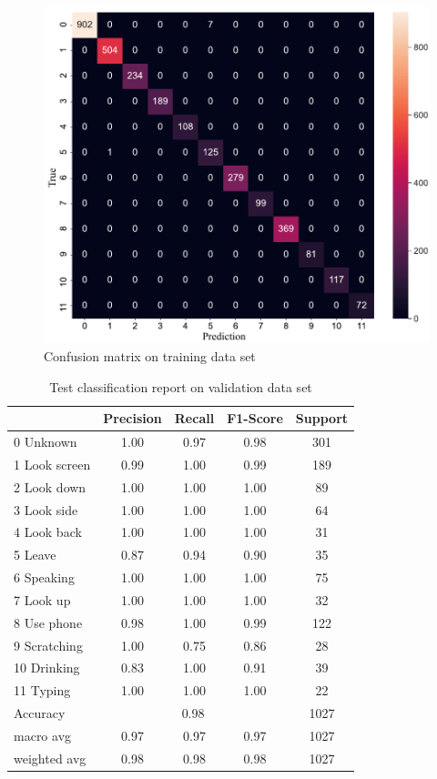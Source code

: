 \begin{figure}[H]
    \centering
    \includegraphics[width=.75\textwidth]{evaluation/imgs/5-confusion_matrix_train.pdf}
    \caption{Confusion matrix on training data set}
    \label{fig:5-confusion_matrix_train}
\end{figure}

\begin{table}[!htbp]
\centering
\begin{tabular}{|l|c|c|c|c|}
\hline
              & Precision & Recall & F1-Score & Support \\ \hline
0 Unknown     & 1.00      & 0.97   & 0.98     & 301     \\ \hline
1 Look screen & 0.99      & 1.00   & 0.99     & 189     \\ \hline
2 Look down   & 1.00      & 1.00   & 1.00     & 89      \\ \hline
3 Look side   & 1.00      & 1.00   & 1.00     & 64      \\ \hline
4 Look back   & 1.00      & 1.00   & 1.00     & 31      \\ \hline
5 Leave       & 0.87      & 0.94   & 0.90     & 35      \\ \hline
6 Speaking    & 1.00      & 1.00   & 1.00     & 75      \\ \hline
7 Look up     & 1.00      & 1.00   & 1.00     & 32      \\ \hline
8 Use phone   & 0.98      & 1.00   & 0.99     & 122     \\ \hline
9 Scratching  & 1.00      & 0.75   & 0.86     & 28      \\ \hline
10 Drinking   & 0.83      & 1.00   & 0.91     & 39      \\ \hline
11 Typing     & 1.00      & 1.00   & 1.00     & 22      \\ \hline
Accuracy      & \multicolumn{3}{c|}{0.98}     & 1027    \\ \hline
macro avg     & 0.97      & 0.97   & 0.97     & 1027    \\ \hline
weighted avg  & 0.98      & 0.98   & 0.98     & 1027    \\ \hline
\end{tabular}
\caption{Test classification report on validation data set}
\label{tab:Test classification report}
\end{table}
